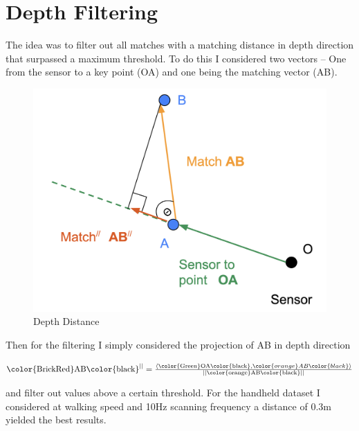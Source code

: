 \clearpage

\section{Depth Filtering}{
    The idea was to filter out all matches with a matching distance in depth direction that surpassed a maximum threshold. To do this I considered two vectors – One from the sensor to a key point (\color{Green}OA\color{black}) and one being the matching vector (\color{orange}AB\color{black}). 

    \begin{figure}[ht]
        \centering
        \includegraphics[scale=0.3]{images/matching_+_outlier_rejection/depth_filtering.png}
        \caption{Depth Distance}
        \label{fig:depth_distance}
    \end{figure}

    Then for the filtering I simply considered the projection of AB in depth direction
    
    \begin{center}
        \Large
        $\text{\color{BrickRed}AB\color{black}}^{||} = \frac{\left< \text{\color{Green}OA\color{black}}, \color{orange}AB\color{black}\right>}{||\text{\color{orange}AB\color{black}}||}$
    \end{center}
    and filter out values above a certain threshold. For the handheld dataset I considered at walking speed and 10Hz scanning frequency a distance of 0.3m yielded the best results.

    
}
\clearpage
